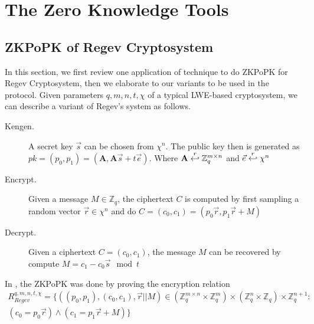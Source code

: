 \section{The Zero Knowledge Tools}
\label{sec:zkptools}
\subsection{ZKPoPK of Regev Cryptosystem}
\label{sec:zkpRegev}
In this section, we first review one application of \cite{ling2013improved} technique to do ZKPoPK for Regev Cryptosystem, then we elaborate to our variants to be used in the protocol.
Given parameters $q, m, n, t, \chi$ of a typical LWE-based cryptosystem, we can describe a variant of Regev's system as follows.
\begin{description}
\item [Kengen.] A secret key $\vec{s}$ can be chosen from $\chi^n$. The public key then is generated as
  $pk = (p_0, p_1) = (\mathbf{A}, \mathbf{A}\vec{s} + t\vec{e})$. Where $\mathbf{A} \stackrel{r}{\hookleftarrow} \mathbb{Z}_q^{m \times n}$
  and $\vec{e} \stackrel{r}{\hookleftarrow} \chi^n$
\item [Encrypt.] Given a message $M \in \mathbb{Z}_q$, the ciphertext $C$ is computed by first sampling a random
  vector $\vec{r} \in \chi^n$ and do
  $C = (c_0, c_1) = (p_0\vec{r}, p_1\vec{r} + M)$
\item [Decrypt.] Given a ciphertext $C = (c_0, c_1)$, the message $M$ can be recovered by compute $M = c_1 - c_0\vec{s} \mod t$
\end{description}
In \cite{ling2013improved}, the ZKPoPK was done by proving the encryption relation
\begin{align*}
  R_{Regev}^{q,m,n,t,\chi} = \{ ((p_0,p_1),(c_0,c_1),\vec{r}||M) \in (\mathbb{Z}_q^{m \times n} \times \mathbb{Z}_q^{m})
  \times (\mathbb{Z}_q^n \times \mathbb{Z}_q) \times \mathbb{Z}_q^{n+1} : \\
  (c_0 = p_0\vec{r}) \land (c_1 = p_1\vec{r} + M) \}
\end{align*}

